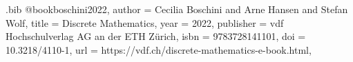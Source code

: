 

\begin{filecontents}[overwrite]{\jobname.bib}
@book{boschini2022,
  author    = {Cecilia Boschini and Arne Hansen and Stefan Wolf},
  title     = {Discrete Mathematics},
  year      = {2022},
  publisher = {vdf Hochschulverlag AG an der ETH Zürich},
  isbn      = {9783728141101},
  doi       = {10.3218/4110-1},
  url       = {https://vdf.ch/discrete-mathematics-e-book.html},
}
\end{filecontents}


\documentclass[a4paper, fontsize=9pt, headings=standardclasses, parskip=half]{scrartcl}
\usepackage{csquotes}



\usepackage{scrlayer-scrpage}
\clearpairofpagestyles
\ofoot{\pagemark} %



\usepackage{graphicx}
\usepackage[dvipsnames]{xcolor}


\usepackage[left=43mm, right=43mm, top=20mm, bottom=30mm]{geometry} %







\usepackage{float}
\usepackage{placeins} 
\usepackage{etoolbox}



